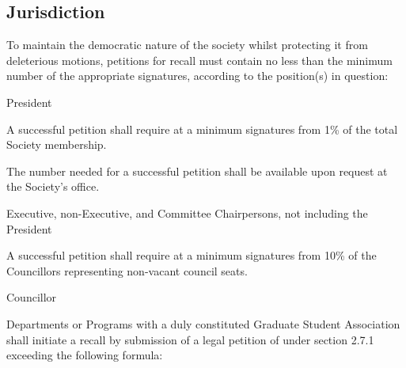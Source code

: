 \subsection{Jurisdiction}
To maintain the democratic nature of the society whilst protecting it from deleterious motions, petitions for recall must contain no less than the minimum number of the appropriate signatures, according to the position(s) in question:

\begin{longenum}[ label*=\thesubsection.\arabic*., align=left]
	\item President
    \begin{longenum}[ label*=\arabic*., align=left]
		\item A successful petition shall require at a minimum signatures from 1\% of the total Society membership.
    	\begin{longenum}[ label*=\arabic*., align=left]
			\item The number needed for a successful petition shall be available upon request at the Society's office.
		\end{longenum}
	\end{longenum}
   \item Executive, non-Executive, and Committee Chairpersons, not including the President
    \begin{longenum}[ label*=\arabic*., align=left]
		\item A successful petition shall require at a minimum signatures from 10\% of the Councillors representing non-vacant council seats.
	\end{longenum}
	\item Councillor
    \begin{longenum}[ label*=\arabic*., align=left]
		\item Departments or Programs with a duly constituted Graduate Student Association shall initiate a recall by submission of a legal petition of under section 2.7.1 exceeding the following formula: \newline
        

\end{longenum}
\end{longenum}
